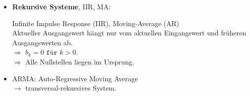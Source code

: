 \begin{itemize}[leftmargin=*]
	\item \textbf{Rekursive Systeme}, IIR, MA:
	
	{\small Infinite Impulse Response (IIR), Moving-Average (AR)\\
		Aktueller Ausgangswert hängt nur vom aktuellen Eingangswert
		und früheren Ausgangswerten ab.}\\
	$\Rightarrow$ $b_k=0 \texttt{ für } k>0$.\\
	$\Rightarrow$ Alle Nullstellen liegen im Ursprung.
	
	\item ARMA: Auto-Regressive Moving Average\\ $\rightarrow$ transversal-rekursives System.
\end{itemize}
